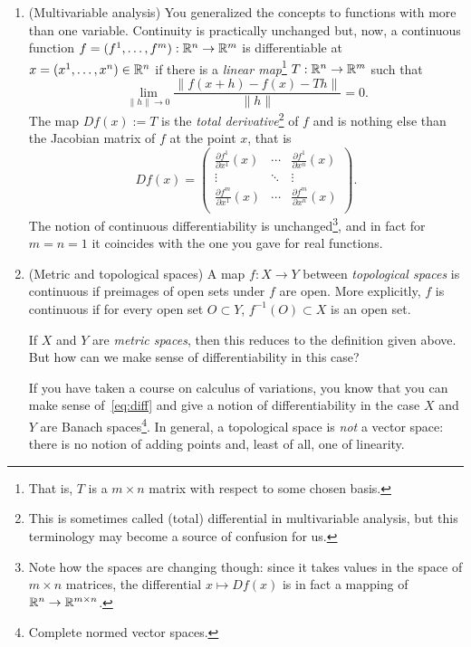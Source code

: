 \begin{enumerate}
  \item (Multivariable analysis) You generalized the concepts to functions with more than one variable.
  Continuity is practically unchanged but, now, a continuous function $f=(f^1, \ldots, f^m):\mathbb{R}^n\to\mathbb{R}^m$ is differentiable at $x=(x^1,\ldots,x^n)\in\mathbb{R}^n$ if there is a \emph{linear map}\footnote{That is, $T$ is a $m\times n$ matrix with respect to some chosen basis.} $T: \mathbb{R}^n\to\mathbb{R}^m$ such that
  \begin{equation}\label{eq:diff}
    \lim_{\|h\|\to 0} \frac{\|f(x+h) - f(x) - T h\|}{\|h\|} = 0.
  \end{equation}
  The map $Df(x) := T$ is the \emph{total derivative}\footnote{This is sometimes called (total) differential in multivariable analysis, but this terminology may become a source of confusion for us.} of $f$ and is nothing else than the Jacobian matrix of $f$ at the point $x$, that is
  \begin{equation}\label{eq:jacobian}
    Df(x) = \begin{pmatrix}
      \frac{\partial f^1}{\partial x^1}(x) & \cdots & \frac{\partial f^1}{\partial x^n}(x) \\
      \vdots & \ddots & \vdots \\
      \frac{\partial f^m}{\partial x^1}(x) & \cdots & \frac{\partial f^m}{\partial x^n}(x) \\
    \end{pmatrix}.
  \end{equation} 
  The notion of continuous differentiability is unchanged\footnote{Note how the spaces are changing though: since it takes values in the space of $m\times n$ matrices, the differential $x\mapsto Df(x)$ is in fact a mapping of $\mathbb{R}^n \to \mathbb{R}^{m\times n}$.}, and in fact for $m=n=1$ it coincides with the one you gave for real functions.
  
  \item (Metric and topological spaces) A map $f:X\to Y$ between \emph{topological spaces} is continuous if preimages of open sets under $f$ are open. More explicitly, $f$ is continuous if for every open set $O\subset Y$, $f^{-1}(O)\subset X$ is an open set.

  If $X$ and $Y$ are \emph{metric spaces}, then this reduces to the definition given above.
  But how can we make sense of differentiability in this case? 
  
  If you have taken a course on calculus of variations, you know that you can make sense of~\eqref{eq:diff} and give a notion of differentiability in the case $X$ and $Y$ are Banach spaces\footnote{Complete normed vector spaces.}.
  In general, a topological space is \emph{not} a vector space: there is no notion of adding points and, least of all, one of linearity.
\end{enumerate}

